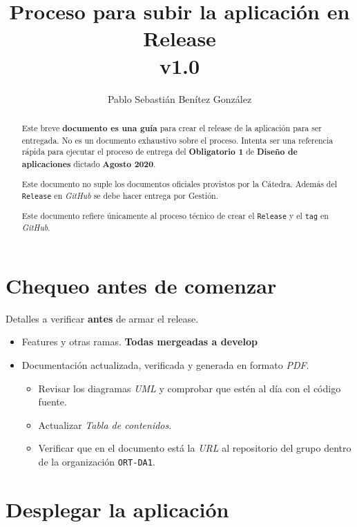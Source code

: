 \documentclass[12pt,a4paper]{article}
\title{Proceso para subir la aplicación en Release\\v1.0}
\author{Pablo Sebastián Benítez González}
\begin{document}
\maketitle

\tableofcontents

\clearpage

\begin{abstract}
Este breve \textbf{documento es una guía} para crear el release de la aplicación para ser entregada. No es un documento exhaustivo sobre el proceso. Intenta ser una referencia rápida para ejecutar el proceso de entrega del \textbf{Obligatorio 1} de \textbf{Diseño de aplicaciones} dictado \textbf{Agosto 2020}.

Este documento no suple los documentos oficiales provistos por la Cátedra. Además del \texttt{Release} en \textit{GitHub} se debe hacer entrega por Gestión.

Este documento refiere únicamente al proceso técnico de crear el \texttt{Release} y el \texttt{tag} en \textit{GitHub}.
\end{abstract}

\section{Chequeo antes de comenzar}

Detalles a verificar \textbf{antes} de armar el release.

\begin{itemize}
	\item Features y otras ramas. \textbf{Todas mergeadas a develop}
	\item Documentación actualizada, verificada y generada en formato \textit{PDF}.
	\begin{itemize}
		\item Revisar los diagramas \textit{UML} y comprobar que estén al día con el código fuente.
		\item Actualizar \textit{Tabla de contenidos}.
		\item Verificar que en el documento está la \textit{URL} al repositorio del grupo dentro de la organización \texttt{ORT-DA1}.
	\end{itemize}
\end{itemize}

\section{Desplegar la aplicación}
\end{document}

